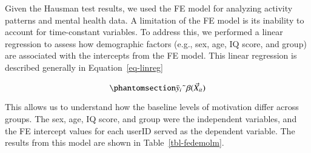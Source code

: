 \documentclass[
  letterpaper,
  number,
  review,
  3p]{elsarticle}
\begin{document}
Given the Hausman test results, we used the FE model for analyzing
activity patterns and mental health data. A limitation of the FE model
is its inability to account for time-constant variables. To address
this, we performed a linear regression to assess how demographic factors
(e.g., sex, age, IQ score, and group) are associated with the intercepts
from the FE model. This linear regression is described generally in
Equation~\ref{eq-linreg}

\begin{equation}\phantomsection\label{eq-linreg}{
\bar{y}_{i} \; \tilde{} \; \beta (\vec{X}_{it})
}\end{equation}

This allows us to understand how the baseline levels of motivation
differ across groups. The sex, age, IQ score, and group were the
independent variables, and the FE intercept values for each userID
served as the dependent variable. The results from this model are shown
in Table~\ref{tbl-fedemolm}.

\begin{table}

\caption{\label{tbl-fedemolm}Fixed Effects and Demographics Regression}


\end{table}%
\end{document}
